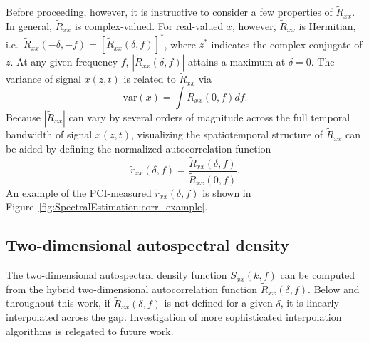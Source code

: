 Before proceeding, however, it is instructive
to consider a few properties of $\tilde{R}_{xx}$.
In general, $\tilde{R}_{xx}$ is complex-valued.
For real-valued $x$, however,
$\tilde{R}_{xx}$ is Hermitian,
i.e.\ $\tilde{R}_{xx}(-\delta, -f) = [\tilde{R}_{xx}(\delta, f)]^*$,
where $z^*$ indicates the complex conjugate of $z$.
At any given frequency $f$,
$|\tilde{R}_{xx}(\delta, f)|$ attains a maximum at $\delta = 0$.
The variance of signal $x(z, t)$ is related to $\tilde{R}_{xx}$ via
\begin{equation}
  \text{var}(x)
  =
  \int \tilde{R}_{xx}(0, f) df.
  \label{eq:SpectralEstimation:variance_relation_to_autocorrelation}
\end{equation}
Because $|\tilde{R}_{xx}|$ can vary by several orders of magnitude
across the full temporal bandwidth of signal $x(z, t)$,
visualizing the spatiotemporal structure of $\tilde{R}_{xx}$
can be aided by defining the normalized autocorrelation function
\begin{equation}
  \tilde{r}_{xx}(\delta, f)
  =
  \frac{\tilde{R}_{xx}(\delta, f)}{\tilde{R}_{xx}(0, f)}.
\end{equation}
An example of the PCI-measured $\tilde{r}_{xx}(\delta, f)$ is shown in
Figure~\ref{fig:SpectralEstimation:corr_example}.


\subsection{Two-dimensional autospectral density}
\label{app:SpectralEstimation:2d_spectra:2d_spectra}
The two-dimensional autospectral density function
$S_{xx}(k, f)$ can be computed from
the hybrid two-dimensional autocorrelation function
$\tilde{R}_{xx}(\delta, f)$.
Below and throughout this work,
if $\tilde{R}_{xx}(\delta, f)$ is not defined for a given $\delta$,
it is linearly interpolated across the gap.
Investigation of more sophisticated interpolation algorithms
is relegated to future work.

